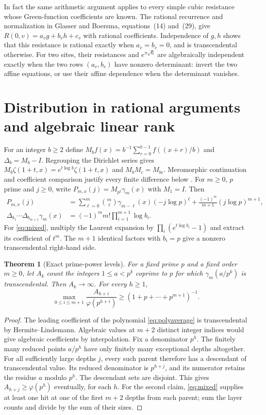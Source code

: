 \documentclass[11pt,a4paper]{article}
\newtheorem{theorem}{Theorem}[section]
\theoremstyle{definition}\newtheorem{definition}[theorem]{Definition}\newtheorem{example}[theorem]{Example}
\theoremstyle{remark}\newtheorem{remark}[theorem]{Remark}
\begin{document}
In fact the same arithmetic argument applies to every simple cubic resistance
whose Green-function coefficients are known. The rational recurrence and
normalization in Glasser and Boersma, equations~(14) and~(29), give
$R(0,v)=a_v g+b_v h+c_v$ with rational coefficients. Independence of $g,h$
shows that this resistance is rational exactly when $a_v=b_v=0$, and is
transcendental otherwise. For two sites, their resistances and
$e^{\pi\sqrt6}$ are algebraically independent exactly when the two rows
$(a_v,b_v)$ have nonzero determinant: invert the two affine equations, or
use their affine dependence when the determinant vanishes.
\section{Distribution in rational arguments and algebraic linear rank}\label{sec:layers}
For an integer $b\ge2$ define $M_b f(x)=b^{-1}\sum_{r=0}^{b-1} f((x+r)/b)$ and $\Delta_b=M_b-I$.
Regrouping the Dirichlet series gives $M_b\zeta(1+t,x)=e^{t\log b}\zeta(1+t,x)$ and $M_bM_c=M_{bc}$. Meromorphic continuation and coefficient comparison justify every finite difference below \cite{Blagouchine,Coffey}.
For $m\ge0$, $p$ prime and $j\ge0$, write $P_{m,x}(j)=M_{p^j}\gamma_m(x)$ with $M_1=I$. Then
\begin{align}\label{eq:polyaverage}
P_{m,x}(j)
 &=\sum_{\ell=0}^m \binom{m}{\ell}\gamma_{m-\ell}(x)(-j\log p)^\ell+
 \frac{(-1)^m}{m+1}(j\log p)^{m+1},\\
\Delta_{b_1}\cdots\Delta_{b_{m+1}}\gamma_m(x)
 &=(-1)^m m!\prod_{i=1}^{m+1}\log b_i .\label{eq:mixed}
\end{align}
For \eqref{eq:mixed}, multiply the Laurent expansion by $\prod_i(e^{t\log b_i}-1)$ and extract its coefficient of $t^m$. The $m+1$ identical factors with $b_i=p$ give a nonzero transcendental right-hand side.

\begin{theorem}[Exact prime-power levels]\label{thm:layers}
For a fixed prime $p$ and a fixed order $m\ge0$, let $A_k$ count the integers $1\le a<p^k$ coprime to $p$ for which $\gamma_m(a/p^k)$ is transcendental. Then $A_k\to\infty$. For every $h\ge1$,
\[
\max_{0\le i\le m+1}\frac{A_{h+i}}{\varphi(p^{h+i})}\ge (1+p+\cdots+p^{m+1})^{-1}.
\]
\end{theorem}
\begin{proof}
The leading coefficient of the polynomial \eqref{eq:polyaverage} is transcendental by Hermite--Lindemann. Algebraic values at $m+2$ distinct integer indices would give algebraic coefficients by interpolation. Fix a denominator $p^h$. The finitely many reduced points $a/p^h$ have only finitely many exceptional depths altogether. For all sufficiently large depths $j$, every such parent therefore has a descendant of transcendental value. Its reduced denominator is $p^{h+j}$, and its numerator retains the residue $a$ modulo $p^h$. The descendant sets are disjoint. This gives $A_{h+j}\ge\varphi(p^h)$ eventually, for each $h$. For the second claim, \eqref{eq:mixed} supplies at least one hit at one of the first $m+2$ depths from each parent; sum the layer counts and divide by the sum of their sizes.
\end{proof}
\end{document}
